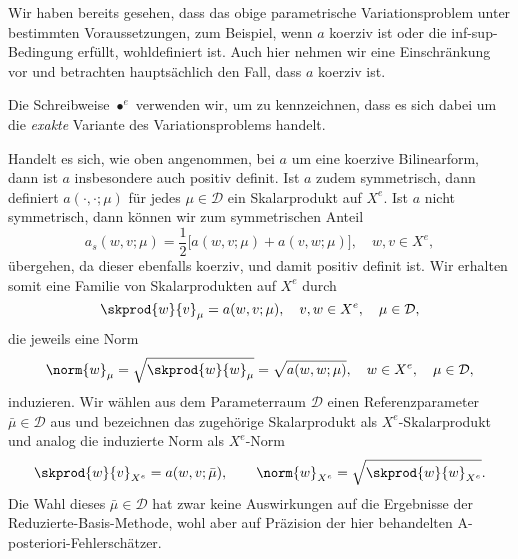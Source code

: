 Wir haben bereits gesehen, dass das obige parametrische Variationsproblem unter bestimmten Voraussetzungen, zum Beispiel, wenn $a$ koerziv ist oder die inf-sup-Bedingung erfüllt, wohldefiniert ist.
Auch hier nehmen wir eine Einschränkung vor und betrachten hauptsächlich den Fall, dass $a$ koerziv ist.

Die Schreibweise $\bullet^e$ verwenden wir, um zu kennzeichnen, dass es sich dabei um die \emph{exakte} Variante des Variationsproblems handelt.

Handelt es sich, wie oben angenommen, bei $a$ um eine koerzive Bilinearform, dann ist $a$ insbesondere auch positiv definit.
Ist $a$ zudem symmetrisch, dann definiert $a(\cdot, \cdot; \mu)$ für jedes $\mu \in \mathcal D$ ein Skalarprodukt auf $X^e$.
Ist $a$ nicht symmetrisch, dann können wir zum symmetrischen Anteil
\begin{equation}
    a_s(w, v; \mu) = \frac{1}{2} \Big[ a(w, v; \mu) + a(v, w; \mu) \Big], \quad w, v \in X^e,
\end{equation}
übergehen, da dieser ebenfalls koerziv, und damit positiv definit ist.
Wir erhalten somit eine Familie von Skalarprodukten auf $X^e$ durch
\begin{equation}
    \skprod{w}{v}_{\mu} = a(w, v; \mu), \quad v, w \in X^e, \quad \mu \in \mathcal D,
\end{equation}
die jeweils eine Norm
\begin{equation}
    \norm{w}_{\mu} = \sqrt{\skprod{w}{w}_{\mu}} = \sqrt{a(w, w; \mu)}, \quad w \in X^e, \quad \mu \in \mathcal D,
\end{equation}
induzieren.
Wir wählen aus dem Parameterraum $\mathcal D$ einen Referenzparameter $\bar \mu \in \mathcal D$ aus und bezeichnen das zugehörige Skalarprodukt als $X^e$-Skalarprodukt und analog die induzierte Norm als $X^e$-Norm
\begin{equation}
    \skprod{w}{v}_{X^e} = a(w, v; \bar \mu),
    \qquad
    \norm{w}_{X^e} = \sqrt{\skprod{w}{w}_{X^e}}.
\end{equation}
Die Wahl dieses $\bar \mu \in \mathcal D$ hat zwar keine Auswirkungen auf die Ergebnisse der Reduzierte-Basis-Methode, wohl aber auf Präzision der hier behandelten A-posteriori-Fehlerschätzer.

